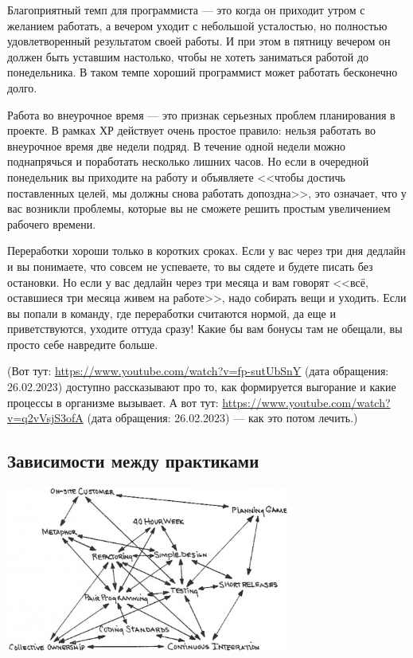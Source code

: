 \documentclass{../../text-style}
\begin{document}
Благоприятный темп для программиста --- это когда он приходит утром с желанием работать, а вечером уходит с небольшой усталостью, но полностью удовлетворенный результатом своей работы. И при этом в пятницу вечером он должен быть уставшим настолько, чтобы не хотеть заниматься работой до понедельника. В таком темпе хороший программист может работать бесконечно долго.

Работа во внеурочное время --- это признак серьезных проблем планирования в проекте. В рамках ХР действует очень простое правило: нельзя работать во внеурочное время две недели подряд. В течение одной недели можно поднапрячься и поработать несколько лишних часов. Но если в очередной понедельник вы приходите на работу и объявляете <<чтобы достичь поставленных целей, мы должны снова работать допоздна>>, это означает, что у вас возникли проблемы, которые вы не сможете решить простым увеличением рабочего времени.

Переработки хороши только в коротких сроках. Если у вас через три дня дедлайн и вы понимаете, что совсем не успеваете, то вы сядете и будете писать без остановки. Но если у вас дедлайн через три месяца и вам говорят <<всё, оставшиеся три месяца живем на работе>>, надо собирать вещи и уходить. Если вы попали в команду, где переработки считаются нормой, да еще и приветствуются, уходите оттуда сразу! Какие бы вам бонусы там не обещали, вы просто себе навредите больше.

(Вот тут: \url{https://www.youtube.com/watch?v=fp-sutUbSnY} (дата обращения: 26.02.2023) доступно рассказывают про то, как формируется выгорание и какие процессы в организме вызывает. А вот тут: \url{https://www.youtube.com/watch?v=q2vVsjS3ofA} (дата обращения: 26.02.2023) --- как это потом лечить.)

\subsection{Зависимости между практиками}

\begin{center}
    \includegraphics[width=0.7\textwidth]{xpPracticesRelationship.png}
\end{center}
\end{document}
